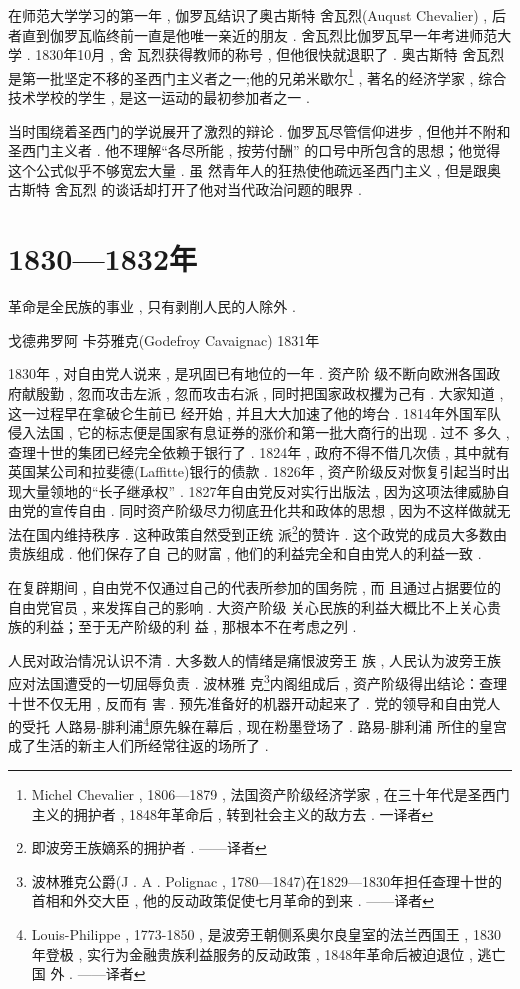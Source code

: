 在师范大学学习的第一年 , 伽罗瓦结识了奥古斯特 \textbullet 舍瓦烈(Auqust Chevalier) , 后者直到伽罗瓦临终前一直是他唯一亲近的朋友 . 舍瓦烈比伽罗瓦早一年考进师范大学 . 1830年10月 , 舍 瓦烈获得教师的称号 , 但他很快就退职了 . 奥古斯特 \textbullet 舍瓦烈是第一批坚定不移的圣西门主义者之一;他的兄弟米歇尔\footnote{Michel Chevalier , 1806—1879 , 法国资产阶级经济学家 , 在三十年代是圣西门主义的拥护者 , 1848年革命后 , 转到社会主义的敌方去 . 一译者} , 著名的经济学家 , 综合技术学校的学生 , 是这一运动的最初参加者之一 . 

当时围绕着圣西门的学说展开了激烈的辩论 . 伽罗瓦尽管信仰进步 , 但他并不附和圣西门主义者 . 他不理解“各尽所能 , 按劳付酬” 的口号中所包含的思想；他觉得这个公式似乎不够宽宏大量 . 虽 然青年人的狂热使他疏远圣西门主义 , 但是跟奥古斯特 \textbullet 舍瓦烈 的谈话却打开了他对当代政治问题的眼界 . 

\section{1830—1832年}
\begin{flushright}
	革命是全民族的事业 , 只有剥削人民的人除外 .
	
	戈德弗罗阿 \textbullet 卡芬雅克(Godefroy Cavaignac) 1831年
\end{flushright}

1830年 , 对自由党人说来 , 是巩固已有地位的一年 . 资产阶 级不断向欧洲各国政府献殷勤 , 忽而攻击左派 , 忽而攻击右派 , 同时把国家政权攫为己有 . 大家知道 , 这一过程早在拿破仑生前已 经开始 , 并且大大加速了他的垮台 . 1814年外国军队侵入法国 ,  它的标志便是国家有息证券的涨价和第一批大商行的出现 . 过不 多久 , 查理十世的集团已经完全依赖于银行了 . 1824年 , 政府不得不借几次债 , 其中就有英国某公司和拉斐德(Laffitte)银行的债款 . 1826年 , 资产阶级反对恢复引起当时出现大量领地的“长子继承权” . 1827年自由党反对实行出版法 , 因为这项法律威胁自由党的宣传自由 . 同时资产阶级尽力彻底丑化共和政体的思想 ,  因为不这样做就无法在国内维持秩序 . 这种政策自然受到正统 派\footnote{即波旁王族嫡系的拥护者 . ——译者}的赞许 . 这个政党的成员大多数由贵族组成 . 他们保存了自 己的财富 , 他们的利益完全和自由党人的利益一致 . 

在复辟期间 , 自由党不仅通过自己的代表所参加的国务院 , 而 且通过占据要位的自由党官员 , 来发挥自己的影响 . 大资产阶级 关心民族的利益大概比不上关心贵族的利益；至于无产阶级的利 益 , 那根本不在考虑之列 . 

人民对政治情况认识不清 . 大多数人的情绪是痛恨波旁王 族 , 人民认为波旁王族应对法国遭受的一切屈辱负责 . 波林雅 克\footnote{波林雅克公爵(J . A . Polignac ,  1780—1847)在1829—1830年担任查理十世的 首相和外交大臣 , 他的反动政策促使七月革命的到来 . ——译者}内阁组成后 , 资产阶级得出结论：查理十世不仅无用 , 反而有 害 . 预先准备好的机器开动起来了 . 党的领导和自由党人的受托 人路易-腓利浦\footnote{Louis-Philippe ,  1773-1850 , 是波旁王朝侧系奥尔良皇室的法兰西国王 ,  1830年登极 , 实行为金融贵族利益服务的反动政策 , 1848年革命后被迫退位 , 逃亡国 外 . ——译者}原先躲在幕后 , 现在粉墨登场了 . 路易-腓利浦 所住的皇宫成了生活的新主人们所经常往返的场所了 . 

